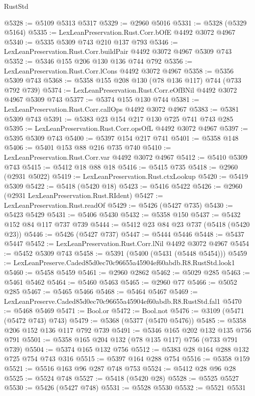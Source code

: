 \begin{lexlean}{RustStd}
\begin{coremodule}
@5328 := @5109 @5313 @5317
@5329 := @2960 @5016
@5331 := @5328 (@5329 @5164)
@5335 := LexLeanPreservation.Rust.Corr.bOfE @4492 @3072 @4967
@5340 := @5335 @5309 @743 @210 @137 @793
@5346 := LexLeanPreservation.Rust.Corr.buildPair @4492 @3072 @4967 @5309 @743
@5352 := @5346 @155 @206 @130 @136 @744 @792
@5356 := LexLeanPreservation.Rust.Corr.lCons @4492 @3072 @4967
@5358 := @5356 @5309 @743
@5368 := @5358 @155 @208 @130 (@78 @136 @117) @744 (@733 @792 @739)
@5374 := LexLeanPreservation.Rust.Corr.eOfBNil @4492 @3072 @4967 @5309 @743
@5377 := @5374 @155 @130 @744
@5381 := LexLeanPreservation.Rust.Corr.callOps @4492 @3072 @4967
@5383 := @5381 @5309 @743
@5391 := @5383 @23 @154 @217 @130 @725 @741 @743 @285
@5395 := LexLeanPreservation.Rust.Corr.opsOfL @4492 @3072 @4967
@5397 := @5395 @5309 @743
@5400 := @5397 @154 @217 @741
@5401 := @5358 @148
@5406 := @5401 @153 @88 @216 @735 @740
@5410 := LexLeanPreservation.Rust.Corr.var @4492 @3072 @4967
@5412 := @5410 @5309 @743
@5415 := @5412 @18 @88 @18
@5416 := @5415 @735
@5418 := @2960 (@2931 @5022)
@5419 := LexLeanPreservation.Rust.ctxLookup
@5420 := @5419 @5309
@5422 := @5418 (@5420 @18)
@5423 := @5416 @5422
@5426 := @2960 (@2931 LexLeanPreservation.Rust.RIdent)
@5427 := LexLeanPreservation.Rust.readOf
@5429 := @5426 (@5427 @735)
@5430 := @5423 @5429
@5431 := @5406 @5430
@5432 := @5358 @150
@5437 := @5432 @152 @84 @117 @737 @739
@5444 := @5412 @23 @84 @23 @737 (@5418 (@5420 @23))
@5446 := @5426 (@5427 @737)
@5447 := @5444 @5446
@5448 := @5437 @5447
@5452 := LexLeanPreservation.Rust.Corr.lNil @4492 @3072 @4967
@5454 := @5452 @5309 @743
@5458 := @5391 (@5400 (@5431 (@5448 @5454)))
@5459 := LexLeanPreserve.Caded85d0ec70c96655a45904ef60abdb.R8.RustStd.look1
@5460 := @5458 @5459
@5461 := @2960 @2862
@5462 := @5029 @285
@5463 := @5461 @5462
@5464 := @5460 @5463
@5465 := @2960 @77
@5466 := @5052 @285
@5467 := @5465 @5466
@5468 := @5464 @5467
@5469 := LexLeanPreserve.Caded85d0ec70c96655a45904ef60abdb.R8.RustStd.fal1
@5470 := @5468 @5469
@5471 := Bool.or
@5472 := Bool.not
@5476 := @3109 (@5471 (@5472 @743) @743)
@5479 := @5368 (@5377 (@5470 @5476))
@5485 := @5358 @206 @152 @136 @117 @792 @739
@5491 := @5346 @165 @202 @132 @135 @756 @791
@5501 := @5358 @165 @204 @132 (@78 @135 @117) @756 (@733 @791 @739)
@5504 := @5374 @165 @132 @756
@5512 := @5383 @28 @164 @288 @132 @725 @754 @743 @316
@5515 := @5397 @164 @288 @754
@5516 := @5358 @159
@5521 := @5516 @163 @96 @287 @748 @753
@5524 := @5412 @28 @96 @28
@5525 := @5524 @748
@5527 := @5418 (@5420 @28)
@5528 := @5525 @5527
@5530 := @5426 (@5427 @748)
@5531 := @5528 @5530
@5532 := @5521 @5531

\end{coremodule}
\end{lexlean}
